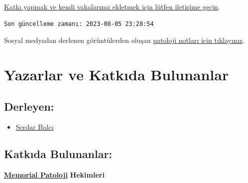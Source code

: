 \documentclass[
  letterpaper,
  DIV=11,
  numbers=noendperiod]{scrreprt}
\providecommand{\tightlist}{%
  \setlength{\itemsep}{0pt}\setlength{\parskip}{0pt}}\usepackage{longtable,booktabs,array}
\begin{document}
\href{https://www.patolojiatlasi.com/katki.html}{Katkı yapmak ve kendi
vakalarınız ekletmek için lütfen iletişime geçin}.

\begin{verbatim}
Son güncelleme zamanı: 2023-08-05 23:28:54
\end{verbatim}

Sosyal medyadan derlenen görüntülerden oluşan
\href{https://www.patolojinotlari.com/}{patoloji notları için
tıklayınız}.


\hypertarget{sec-yazarlar-katkida-bulunanlar}{%
\chapter*{Yazarlar ve Katkıda
Bulunanlar}\label{sec-yazarlar-katkida-bulunanlar}}


\hypertarget{sec-derleyen}{%
\section*{Derleyen:}\label{sec-derleyen}}


\begin{itemize}
\tightlist
\item
  \href{https://www.serdarbalci.com}{Serdar Balcı}
\end{itemize}

\hypertarget{sec-katkida-bulunanlar}{%
\section*{Katkıda Bulunanlar:}\label{sec-katkida-bulunanlar}}


\href{https://patoloji.memorial.com.tr/}{\textbf{Memorial Patoloji}}
\textbf{Hekimleri}
\end{document}
